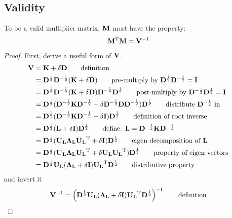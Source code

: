 \subsection{Validity}

To be a valid multiplier matrix, $\mathbf{M}$ must have the property:
\[
	\mathbf{M} ^\mathrm{T} \mathbf{M} = \mathbf{V}^{-1}
\]





\begin{proof}
First, derive a useful form of $\mathbf{V}$.
\begin{align}
\bV &= \bK + \delta \bD   																								\tag*{definition}\\
    &= \bD\halfpow \bD\neghalfpow (\bK + \delta \bD)                                                                 	\tag*{pre-multiply by $\bD\halfpow \bD\neghalfpow = \bI$}\\
    &= \bD\halfpow \bD\neghalfpow (\bK + \delta \bD) \bD\neghalfpow \bD\halfpow 										\tag*{post-multiply by $\bD\neghalfpow \bD\halfpow = \bI$}\\
    &= \bD\halfpow(\bD\neghalfpow \bK \bD\neghalfpow + \delta \bD\neghalfpow \bD \bD\neghalfpow)\bD\halfpow 			\tag*{distribute $\bD\neghalfpow$ in}\\
    &= \bD\halfpow(\bD\neghalfpow \bK \bD\neghalfpow + \delta \bI) \bD\halfpow                                  		\tag*{definition of root inverse}\\
    &= \bD\halfpow(\bL + \delta \bI) \bD\halfpow                                                                 		\tag*{define: $\bL = \bD\neghalfpow\bK \bD\neghalfpow$}\\
    &= \bD\halfpow(\bUL \bLL \bUL \T + \delta \bI) \bD\halfpow                                                			\tag*{eigen decomposition of $\bL$}\\
    &= \bD\halfpow(\bUL \bLL \bUL \T + \delta \bUL \bUL \T)\bD\halfpow                                         			\tag*{property of eigen vectors}\\
    &= \bD\halfpow\bUL (\bLL + \delta \bI) \bUL \T \bD\halfpow                                                			\tag*{distributive property}
\end{align}
and invert it
\begin{align}
\bV\inv &= \left( \bD\halfpow\bUL (\bLL + \delta \bI) \bUL \T \bD\halfpow \right)\inv  											\tag*{definition}\\

\end{align}
\end{proof}
